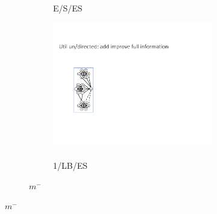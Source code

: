 \begin{figure}[t]
\begin{subfigure}{0.3\textwidth}
\begin{subfigure}{0.3\textwidth}
        \caption{\\E/S/ES}
        \label{fig:Egal_size_remove}
        \end{subfigure}
        \hfill
        \begin{subfigure}{0.3\textwidth}
                    \addtocounter{subfigure}{-1}
        \renewcommand\thesubfigure{\alph{subfigure}3}
        \centering
        \includegraphics[page=27,width=\textwidth]{Graphs/graphs.pdf}
        \caption{\\1/LB/ES}
        \label{fig:least1_size_remove}
        \end{subfigure}    
        \addtocounter{subfigure}{-1}
    \caption{$m^-$}
    \label{fig:remove_es_subfig} 
    \end{subfigure}

    

\end{figure}
